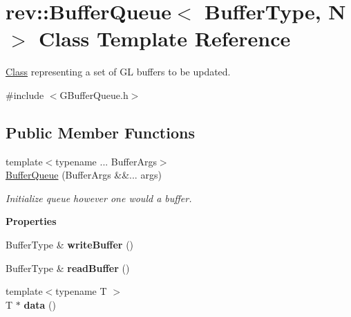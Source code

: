 \hypertarget{classrev_1_1_buffer_queue}{}\section{rev\+::Buffer\+Queue$<$ Buffer\+Type, N $>$ Class Template Reference}
\label{classrev_1_1_buffer_queue}


\mbox{\hyperlink{struct_class}{Class}} representing a set of GL buffers to be updated.  




{\ttfamily \#include $<$G\+Buffer\+Queue.\+h$>$}

\subsection*{Public Member Functions}
\begin{DoxyCompactItemize}
\item 
{\footnotesize template$<$typename ... Buffer\+Args$>$ }\\\mbox{\hyperlink{classrev_1_1_buffer_queue_a593525b33b1dae5e5f3b6dcb40489b0d}{Buffer\+Queue}} (Buffer\+Args \&\&... args)
\begin{DoxyCompactList}\small\item\em Initialize queue however one would a buffer. \end{DoxyCompactList}\end{DoxyCompactItemize}
\begin{Indent}\textbf{ Properties}\par
\begin{DoxyCompactItemize}
\item 
\mbox{\label{classrev_1_1_buffer_queue_acd4b22879289f5183d38796ec7f96053}} 
Buffer\+Type \& {\bfseries write\+Buffer} ()
\item 
\mbox{\label{classrev_1_1_buffer_queue_a68ceb8c1756f6535bdc9436544ea1cf0}} 
Buffer\+Type \& {\bfseries read\+Buffer} ()
\item 
\mbox{\label{classrev_1_1_buffer_queue_ab5cd55cf1c81794df3e02c9697e3121f}} 
{\footnotesize template$<$typename T $>$ }\\T $\ast$ {\bfseries data} ()
\end{DoxyCompactItemize}
\end{Indent}
